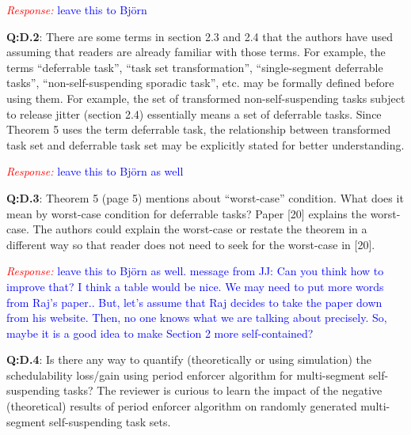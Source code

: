 \documentclass[12pt]{article}
\newcommand{\response}[1]{\textcolor{red}{\emph{Response: }} \textcolor{blue}{#1}\vspace{0.25in}}
\begin{document}
\response{leave this to Bj\"orn}

{\bf Q:D.2}:  
There are some terms in section 2.3 and 2.4 that the authors have used
assuming that readers are already familiar with those terms. For example,
the terms “deferrable task”, “task set transformation”,
“single-segment deferrable tasks”, “non-self-suspending sporadic
task”, etc. may be formally defined before using them. For example, the
set of transformed non-self-suspending tasks subject to release jitter
(section 2.4) essentially means a set of deferrable tasks. Since Theorem 5
uses the term deferrable task, the relationship between transformed task set
and deferrable task set may be explicitly stated for better understanding. 

\response{leave this to Bj\"orn as well}


{\bf Q:D.3}:  
Theorem 5 (page 5) mentions about “worst-case” condition. What does it
mean by worst-case condition for deferrable tasks? Paper [20] explains the
worst-case. The authors could explain the worst-case or restate the theorem
in a different way so that reader does not need to seek for the worst-case
in [20].   

\response{leave this to Bj\"orn as well.
message from JJ:
Can you think how to improve that? I think a table would be nice. We may need to put more words from Raj’s paper.. 
But, let’s assume that Raj decides to take the paper down from his website. Then, no one knows what we are talking about precisely. So, maybe it is a good idea to make Section 2 more self-contained?
}

{\bf Q:D.4}:  
Is there any way to quantify (theoretically or using simulation) the
schedulability loss/gain using period enforcer algorithm for multi-segment
self-suspending tasks? The reviewer is curious to learn the impact of the
negative (theoretical) results of period enforcer algorithm on randomly
generated multi-segment self-suspending task sets.  
\end{document}
